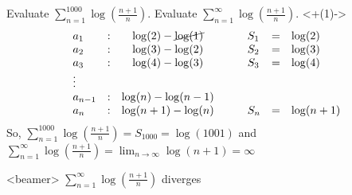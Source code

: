 \begin{frame}[t]
Evaluate $\displaystyle\sum_{n=1}^{1000} \log\left(\frac{n+1}{n}\right).$
\hfill
Evaluate $\displaystyle\sum_{n=1}^{\infty} \log\left(\frac{n+1}{n}\right)$.
\sonslide<+(1)->{
\[\begin{array}{lccclclcc}
a_1&:& \log(2)-\cancel{\log(1)} &\quad & S_1 &=&\log(2)\\
a_2&:& \log(3)-\log(2) &\quad & S_2 &=&\log(3)\\
a_3&:& \log(4)-\log(3) &\quad & S_3 &=&\log(4)\\
\vdots\\
a_{n-1}&:& \log(n)-\log(n-1) \\
a_n&:& \log(n+1)-\log(n) &\quad & S_n &=&\log(n+1)\\
\end{array}\]
So, $\displaystyle\sum_{n=1}^{1000} \log\left(\frac{n+1}{n}\right)=S_{1000}=\log(1001)$ and 
$\displaystyle\sum_{n=1}^{\infty} \log\left(\frac{n+1}{n}\right)=\lim_{n \to \infty }\log(n+1)=\infty$
}

\end{frame}
\begin{frame}<beamer>
$\displaystyle\sum_{n=1}^\infty \log\left(\frac{n+1}{n}\right)$ diverges

\vspace{-1cm}\begin{center}
\end{center}
\end{frame}
